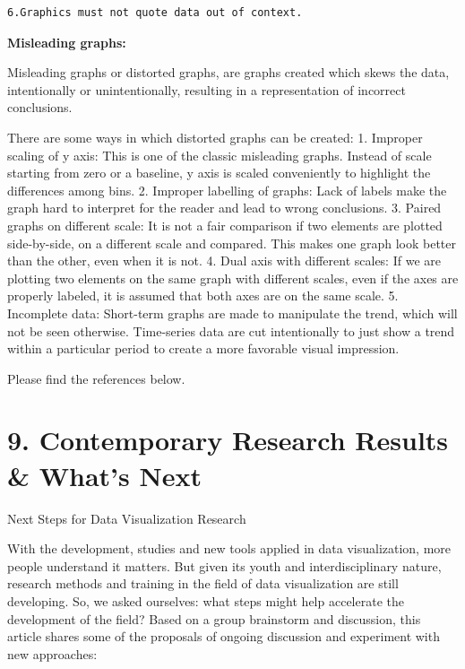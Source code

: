 \documentclass[]{book}
\theoremstyle{definition}
\theoremstyle{definition}
\theoremstyle{definition}
\theoremstyle{remark}
\begin{document}
\begin{verbatim}
6.Graphics must not quote data out of context.
\end{verbatim}

\textbf{Misleading graphs:}

Misleading graphs or distorted graphs, are graphs created which skews
the data, intentionally or unintentionally, resulting in a
representation of incorrect conclusions.

There are some ways in which distorted graphs can be created: 1.
Improper scaling of y axis: This is one of the classic misleading
graphs. Instead of scale starting from zero or a baseline, y axis is
scaled conveniently to highlight the differences among bins. 2. Improper
labelling of graphs: Lack of labels make the graph hard to interpret for
the reader and lead to wrong conclusions. 3. Paired graphs on different
scale: It is not a fair comparison if two elements are plotted
side-by-side, on a different scale and compared. This makes one graph
look better than the other, even when it is not. 4. Dual axis with
different scales: If we are plotting two elements on the same graph with
different scales, even if the axes are properly labeled, it is assumed
that both axes are on the same scale. 5. Incomplete data: Short-term
graphs are made to manipulate the trend, which will not be seen
otherwise. Time-series data are cut intentionally to just show a trend
within a particular period to create a more favorable visual impression.

Please find the references below.

\section{9. Contemporary Research Results \& What's
Next}\label{contemporary-research-results-whats-next}

Next Steps for Data Visualization Research

With the development, studies and new tools applied in data
visualization, more people understand it matters. But given its youth
and interdisciplinary nature, research methods and training in the field
of data visualization are still developing. So, we asked ourselves: what
steps might help accelerate the development of the field? Based on a
group brainstorm and discussion, this article shares some of the
proposals of ongoing discussion and experiment with new approaches:
\end{document}

